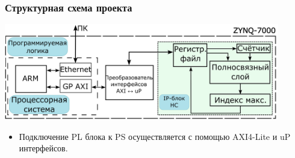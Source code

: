 \begin{frame}[t]
    \frametitle{Структурная схема проекта}
    \begin{block}{} %
        \vspace{1mm}
        \centering \includegraphics[width = 0.9\textwidth]{pics/struct_2.png}
        \begin{itemize}\small
            \item Подключение PL блока к PS осуществляется с помощью AXI4-Lite и uP интерфейсов.
        \end{itemize}     
    \end{block}  
\end{frame}


